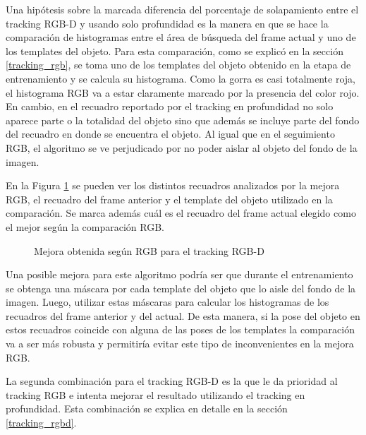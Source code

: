 Una hipótesis sobre la marcada diferencia del porcentaje de solapamiento entre el tracking RGB-D y usando solo profundidad es la manera en que se hace la comparación de histogramas entre el área de búsqueda del frame actual y uno de los templates del objeto.  Para esta comparación, como se explicó en la sección \ref{tracking_rgb}, se toma uno de los templates del objeto obtenido en la etapa de entrenamiento y se calcula su histograma. Como la gorra es casi totalmente roja, el histograma RGB va a estar claramente marcado por la presencia del color rojo. En cambio, en el recuadro reportado por el tracking en profundidad no solo aparece parte o la totalidad del objeto sino que además se incluye parte del fondo del recuadro en donde se encuentra el objeto. Al igual que en el seguimiento RGB, el algoritmo se ve perjudicado por no poder aislar al objeto del fondo de la imagen.

En la Figura \ref{mejora_rgb_en_tracking_rgbd} se pueden ver los distintos recuadros analizados por la mejora RGB, el recuadro del frame anterior y el template del objeto utilizado en la comparación. Se marca además cuál es el recuadro del frame actual elegido como el mejor según la comparación RGB.

\begin{figure}
	\caption{Mejora obtenida según RGB para el tracking RGB-D}
	\label{mejora_rgb_en_tracking_rgbd}
\end{figure}

Una posible mejora para este algoritmo podría ser que durante el entrenamiento se obtenga una máscara por cada template del objeto que lo aisle del fondo de la imagen. Luego, utilizar estas máscaras para calcular los histogramas de los recuadros del frame anterior y del actual. De esta manera, si la pose del objeto en estos recuadros coincide con alguna de las poses de los templates la comparación va a ser más robusta y permitiría evitar este tipo de inconvenientes en la mejora RGB.

La segunda combinación para el tracking RGB-D es la que le da prioridad al tracking RGB e intenta mejorar el resultado utilizando el tracking en profundidad. Esta combinación se explica en detalle en la sección \ref{tracking_rgbd}.

